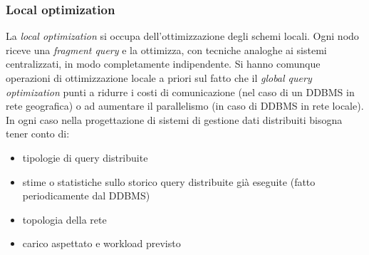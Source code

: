 \documentclass[a4paper,12pt, oneside]{book}
\begin{document}
\subsubsection{Local optimization}
La \textit{local optimization} si occupa dell'ottimizzazione degli schemi
locali. Ogni nodo riceve una \textit{fragment query} e la ottimizza, con
tecniche analoghe ai sistemi centralizzati, in modo completamente
indipendente. Si hanno comunque operazioni di ottimizzazione locale a priori
sul fatto che il \textit{global query optimization} punti a ridurre i costi di
comunicazione (nel caso di un DDBMS in rete geografica) o ad aumentare il
parallelismo (in caso di DDBMS in rete locale).\\
In ogni caso nella progettazione di sistemi di gestione dati distribuiti bisogna
tener conto di:
\begin{itemize}
  \item tipologie di query distribuite
  \item stime o statistiche sullo storico query distribuite già eseguite (fatto
  periodicamente dal DDBMS)
  \item topologia della rete
  \item carico aspettato e workload previsto
\end{itemize}
\end{document}
